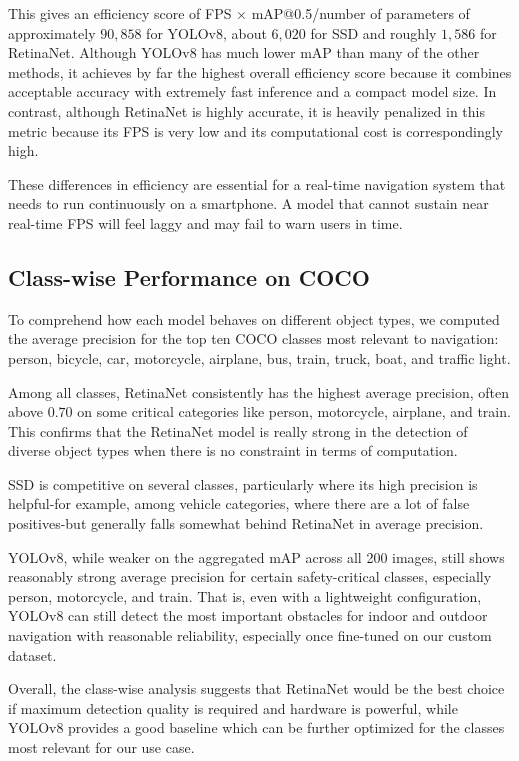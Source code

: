 \documentclass{FastFyp}
\begin{document}
This gives an efficiency score of FPS × mAP@0.5/number of parameters of approximately $90,858$ for YOLOv8, about $6,020$ for SSD and roughly $1,586$ for RetinaNet. Although YOLOv8 has much lower mAP than many of the other methods, it achieves by far the highest overall efficiency score because it combines acceptable accuracy with extremely fast inference and a compact model size. In contrast, although RetinaNet is highly accurate, it is heavily penalized in this metric because its FPS is very low and its computational cost is correspondingly high.

These differences in efficiency are essential for a real-time navigation system that needs to run continuously on a smartphone. A model that cannot sustain near real-time FPS will feel laggy and may fail to warn users in time.

\subsection{Class-wise Performance on COCO}

To comprehend how each model behaves on different object types, we computed the average precision for the top ten COCO classes most relevant to navigation: person, bicycle, car, motorcycle, airplane, bus, train, truck, boat, and traffic light.

Among all classes, RetinaNet consistently has the highest average precision, often above $0.70$ on some critical categories like person, motorcycle, airplane, and train. This confirms that the RetinaNet model is really strong in the detection of diverse object types when there is no constraint in terms of computation.

SSD is competitive on several classes, particularly where its high precision is helpful-for example, among vehicle categories, where there are a lot of false positives-but generally falls somewhat behind RetinaNet in average precision.

YOLOv8, while weaker on the aggregated mAP across all 200 images, still shows reasonably strong average precision for certain safety-critical classes, especially person, motorcycle, and train. That is, even with a lightweight configuration, YOLOv8 can still detect the most important obstacles for indoor and outdoor navigation with reasonable reliability, especially once fine-tuned on our custom dataset.

Overall, the class-wise analysis suggests that RetinaNet would be the best choice if maximum detection quality is required and hardware is powerful, while YOLOv8 provides a good baseline which can be further optimized for the classes most relevant for our use case.
\end{document}
